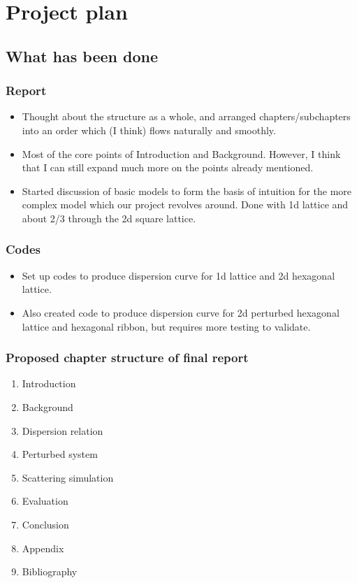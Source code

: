 \chapter{Project plan}

\section{What has been done}

\subsection{Report}
\begin{itemize}
  \item Thought about the structure as a whole, and arranged
        chapters/subchapters into an order which (I think) flows naturally and
        smoothly.
  \item Most of the core points of Introduction and Background. However, I
        think that I can still expand much more on the points already
        mentioned.
  \item Started discussion of basic models to form the basis of intuition for
        the more complex model which our project revolves around. Done with 1d
        lattice and about 2/3 through the 2d square lattice.
\end{itemize}

\subsection{Codes}
\begin{itemize}
  \item Set up codes to produce dispersion curve for 1d lattice and 2d
        hexagonal lattice.
  \item Also created code to produce dispersion curve for 2d perturbed
        hexagonal lattice and hexagonal ribbon, but requires more testing to
        validate. 
\end{itemize}

\subsection{Proposed chapter structure of final report}
\begin{enumerate}
  \item Introduction
  \item Background
  \item Dispersion relation
  \item Perturbed system
  \item Scattering simulation
  \item Evaluation
  \item Conclusion
  \item Appendix
  \item Bibliography
\end{enumerate}

